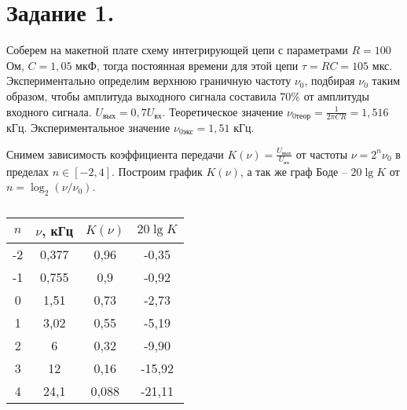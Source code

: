


	
	
	\section*{Задание 1.}
	
	\noindent Соберем на макетной плате схему интегрирующей цепи с параметрами $R = 100$ Ом, $C = 1,05$ мкФ, тогда постоянная времени для этой цепи $\tau = R C = 105$ мкс.
	\vspace*{5mm}
	\noindent Экспериментально определим верхнюю граничную частоту $\nu_0$, подбирая $\nu_0$ таким образом, чтобы амплитуда выходного сигнала составила $70 \%$ от амплитуды входного сигнала. $U_{\text{вых}} = 0,7 U_{\text{вх}}$.
	\vspace*{5mm}
	\noindent Теоретическое значение $\nu_{\text{0теор}} = \frac{1}{2 \pi C R} = 1,516$ кГц. 
	Экспериментальное значение $\nu_{\text{0экс}} = 1,51$ кГц.
	
	\vspace*{5mm}
	\noindent Снимем зависимость коэффициента передачи $K(\nu) = \frac{U_{\text{вых}}}{U_{\text{вх}}}$ от частоты $\nu = 2^n \nu_0$ в пределах $n \in [-2, 4]$. Построим график $K(\nu)$, а так же граф Боде -- $20 \lg K$ от $n = \log_2 (\nu / \nu_0)$.

	\begin{table}[h!]
		\begin{center}
			\begin{tabular}{|c|c|c|c|}
				\hline
				$n$& $\nu$, кГц & $K(\nu)$ &  $20 \lg K$      \\ \hline
				-2 & 0,377      & 0,96     & -0,35  \\ \hline
				-1 & 0,755      & 0,9      & -0,92  \\ \hline
				0  & 1,51       & 0,73     & -2,73  \\ \hline
				1  & 3,02       & 0,55     & -5,19  \\ \hline
				2  & 6          & 0,32     & -9,90  \\ \hline
				3  & 12         & 0,16     & -15,92 \\ \hline
				4  & 24,1       & 0,088    & -21,11 \\ \hline
			\end{tabular}
		\end{center}
		\caption{}
	\end{table}


